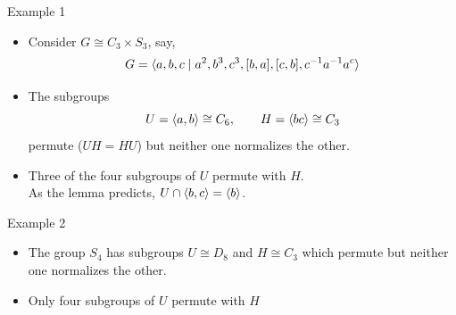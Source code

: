 \documentclass[xcolor=dvipsnames,11pt,hide notes]{beamer}
\theoremstyle{definition}
\theoremstyle{remark}
\numberwithin{theorem}{section}
\numberwithin{claim}{section}
\numberwithin{equation}{section}
\numberwithin{conjecture}{section}
\begin{document}
\begin{frame}[fragile,label=ExampleOfPermutingIso,shrink=5]{Example 1}

  \begin{itemize}
  \item<1-> Consider $G\cong C_3 \times S_3$, say,
    \[G = \langle a,b,c \mid a^2, b^3, c^3, [b,a], [c,b], c^{-1}a^{-1}a^c\rangle\]
\item<2->The subgroups 
\[U = \langle a,b\rangle \cong C_6, \qquad H = \langle bc\rangle\cong C_3\]
permute ($UH = HU$) but neither one normalizes the other.
  \end{itemize}
\vskip4mm
  \begin{itemize}
  \item<4-> Three of the four subgroups of $U$ permute with $H$.
\\[4pt] As the lemma predicts, $U\cap \langle b, c\rangle = \langle b\rangle$.
  \end{itemize}
\end{frame}


\begin{frame}[fragile,label=ExampleOfPermutingIso,shrink=5]{Example 2}

  \begin{itemize}
  \item<1-> The group $S_4$ has subgroups $U\cong D_8$ and $H\cong C_3$ which 
    permute but neither one normalizes the other.
  \end{itemize}
\vskip4mm
\begin{itemize}
\item<2-> Only four subgroups of $U$ permute with $H$%
\end{itemize}
\end{frame}
\end{document}

